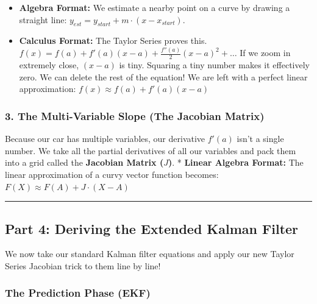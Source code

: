 \documentclass[
]{article}
\providecommand{\tightlist}{%
  \setlength{\itemsep}{0pt}\setlength{\parskip}{0pt}}
\begin{document}
\begin{itemize}
\tightlist
\item
  \textbf{Algebra Format:} We estimate a nearby point on a curve by
  drawing a straight line:
  \(y_{est} = y_{start} + m \cdot (x - x_{start})\).
\item
  \textbf{Calculus Format:} The Taylor Series proves this.
  \(f(x) = f(a) + f'(a)(x-a) + \frac{f''(a)}{2}(x-a)^2 + \dots\) If we
  zoom in extremely close, \((x-a)\) is tiny. Squaring a tiny number
  makes it effectively zero. We can delete the rest of the equation! We
  are left with a perfect linear approximation:
  \(f(x) \approx f(a) + f'(a)(x-a)\)
\end{itemize}

\subsubsection{3. The Multi-Variable Slope (The Jacobian
Matrix)}\label{the-multi-variable-slope-the-jacobian-matrix}

Because our car has multiple variables, our derivative \(f'(a)\) isn't a
single number. We take all the partial derivatives of all our variables
and pack them into a grid called the \textbf{Jacobian Matrix (\(J\))}. *
\textbf{Linear Algebra Format:} The linear approximation of a curvy
vector function becomes: \(F(X) \approx F(A) + J \cdot (X - A)\)

\begin{center}\rule{0.5\linewidth}{0.5pt}\end{center}

\subsection{Part 4: Deriving the Extended Kalman
Filter}\label{part-4-deriving-the-extended-kalman-filter}

We now take our standard Kalman filter equations and apply our new
Taylor Series Jacobian trick to them line by line!

\subsubsection{The Prediction Phase
(EKF)}\label{the-prediction-phase-ekf}
\end{document}

